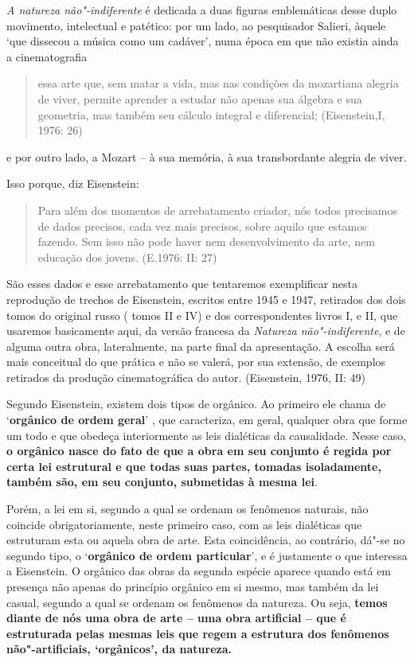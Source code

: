 \emph{A natureza não"-indiferente} é dedicada a duas figuras emblemáticas
desse duplo movimento, intelectual e patético: por um lado, ao
pesquisador Salieri, àquele `que dissecou a música como um cadáver',
numa época em que não existia ainda a cinematografia

\begin{quote}
essa arte que, sem matar a vida, mas nas condições da mozartiana alegria
de viver, permite aprender a estudar não apenas sua álgebra e sua
geometria, mas também seu cálculo integral e diferencial; (Eisenstein,I,
1976: 26)
\end{quote}

e por outro lado, a Mozart -- à sua memória, à sua transbordante alegria
de viver.

Isso porque, diz Eisenstein:

\begin{quote}
Para além dos momentos de arrebatamento criador, nós todos precisamos de
dados precisos, cada vez mais precisos, sobre aquilo que estamos
fazendo. Sem isso não pode haver nem desenvolvimento da arte, nem
educação dos jovens. (E.1976: II: 27)
\end{quote}

São esses dados e esse arrebatamento que tentaremos exemplificar nesta
reprodução de trechos de Eisenstein, escritos entre 1945 e 1947,
retirados dos dois tomos do original russo ( tomos II e IV) e dos
correspondentes livros I, e II, que usaremos basicamente aqui, da versão
francesa da \emph{Natureza não"-indiferente}, e de alguma outra obra,
lateralmente, na parte final da apresentação. A escolha será mais
conceitual do que prática e não se valerá, por sua extensão, de exemplos
retirados da produção cinematográfica do autor. (Eisenstein, 1976, II:
49)

Segundo Eisenstein, existem dois tipos de orgânico. Ao primeiro ele
chama de `\textbf{orgânico de ordem geral}' , que caracteriza, em geral,
qualquer obra que forme um todo e que obedeça interiormente as leis
dialéticas da causalidade. Nesse caso, \textbf{o orgânico nasce do fato
de que a obra em seu conjunto é regida por certa lei estrutural e que
todas suas partes, tomadas isoladamente, também são, em seu conjunto,
submetidas à mesma lei}.

Porém, a lei em si, segundo a qual se ordenam os fenômenos naturais, não
coincide obrigatoriamente, neste primeiro caso, com as leis dialéticas
que estruturam esta ou aquela obra de arte. Esta coincidência, ao
contrário, dá"-se no segundo tipo, o `\textbf{orgânico de ordem
particular}', e é justamente o que interessa a Eisenstein. O orgânico
das obras da segunda espécie aparece quando está em presença não apenas
do princípio orgânico em si mesmo, mas também da lei casual, segundo a
qual se ordenam os fenômenos da natureza. Ou seja, \textbf{temos diante
de nós uma obra de arte -- uma obra artificial -- que é estruturada
pelas mesmas leis que regem a estrutura dos fenômenos não"-artificiais,
`orgânicos', da natureza.}

